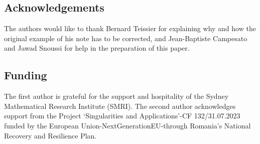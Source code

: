 \documentclass[12pt]{amsart}
\theoremstyle{definition}
\numberwithin{equation}{section}
\begin{document}


\subsection*{Acknowledgements}
The authors would like to thank Bernard Teissier for explaining why and how the original example of his note \cite{Te90} has to be corrected, and Jean-Baptiste Campesato and Jawad Snoussi for help in the preparation of this paper.

\subsection*{Funding}
{The first author is grateful for the support and hospitality of the Sydney Mathematical Research Institute (SMRI). %
The second author  acknowledges support from the Project ‘Singularities and Applications’-CF
132/31.07.2023 funded by the European Union-NextGenerationEU-through Romania’s National
Recovery and Resilience Plan.
}



\normalsize
\end{document}

